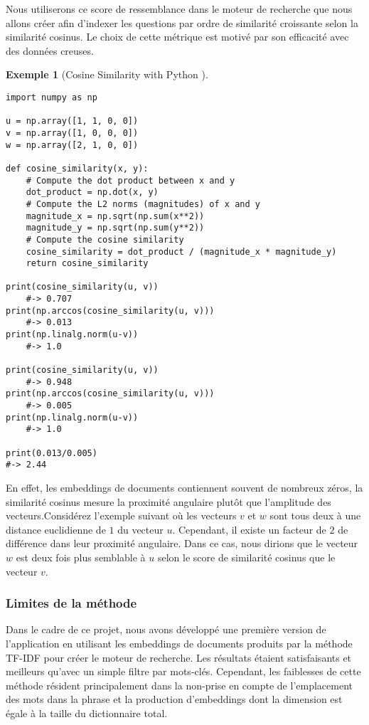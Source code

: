 \documentclass[12pt]{article}
\theoremstyle{definition}
\newtheorem{ex}{Exemple}
\begin{document}
Nous utiliserons ce score de ressemblance dans le moteur de recherche que nous allons créer afin d'indexer les questions par ordre de similarité croissante selon la similarité cosinus. Le choix de cette métrique est motivé par son efficacité avec des données creuses.\\

\begin{ex}[Cosine Similarity with Python \cite{CosineSimilarity}]\hfill\\
	
\begin{lstlisting}
import numpy as np

u = np.array([1, 1, 0, 0])
v = np.array([1, 0, 0, 0])
w = np.array([2, 1, 0, 0])

def cosine_similarity(x, y):
	# Compute the dot product between x and y
	dot_product = np.dot(x, y)
	# Compute the L2 norms (magnitudes) of x and y
	magnitude_x = np.sqrt(np.sum(x**2)) 
	magnitude_y = np.sqrt(np.sum(y**2))
	# Compute the cosine similarity
	cosine_similarity = dot_product / (magnitude_x * magnitude_y)
	return cosine_similarity

print(cosine_similarity(u, v))
	#-> 0.707
print(np.arccos(cosine_similarity(u, v)))
	#-> 0.013
print(np.linalg.norm(u-v))
	#-> 1.0

print(cosine_similarity(u, v))
	#-> 0.948
print(np.arccos(cosine_similarity(u, v)))
	#-> 0.005
print(np.linalg.norm(u-v))
	#-> 1.0

print(0.013/0.005)
#-> 2.44
\end{lstlisting}

	En effet, les embeddings de documents contiennent souvent de nombreux zéros, la similarité cosinus mesure la proximité angulaire plutôt que l'amplitude des vecteurs.Considérez l'exemple suivant où les vecteurs $v$ et $w$ sont tous deux à une distance euclidienne de $1$ du vecteur $u$. Cependant, il existe un facteur de $2$ de différence dans leur proximité angulaire. Dans ce cas, nous dirions que le vecteur $w$ est deux fois plus semblable à $u$ selon le score de similarité cosinus que le vecteur $v$.
\end{ex}




\subsubsection{Limites de la méthode}
Dans le cadre de ce projet, nous avons développé une première version de l'application en utilisant les embeddings de documents produits par la méthode TF-IDF pour créer le moteur de recherche. Les résultats étaient satisfaisants et meilleurs qu'avec un simple filtre par mots-clés. Cependant, les faiblesses de cette méthode résident principalement dans la non-prise en compte de l'emplacement des mots dans la phrase et la production d'embeddings dont la dimension est égale à la taille du dictionnaire total. 
\end{document}
